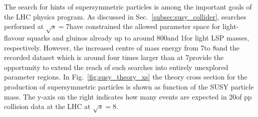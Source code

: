 The search for hints of supersymmetric particles is among the important goals of the LHC physics program. As discussed in Sec.~\ref{subsec:susy_collider}, searches performed at $\sqrt{s} = 7$\tev have constrained the allowed parameter space for light-flavour squarks and gluinos already up to around 800\gev and 1\tev for light LSP masses, respectively. However, the increased centre of mass energy from 7\tev to 8\tev and the recorded dataset which is around four times larger than at 7\tev provide the opportunity to extend the reach of such searches into entirely unexplored parameter regions. In Fig.~\ref{fig:susy_theory_xs} the theory cross section for the production of supersymmetric particles is shown as function of the SUSY particle mass. The y-axis on the right indicates how many events are expected in 20\fbinv of pp collision data at the LHC at $\sqrt{s}=8$\tev. \\

